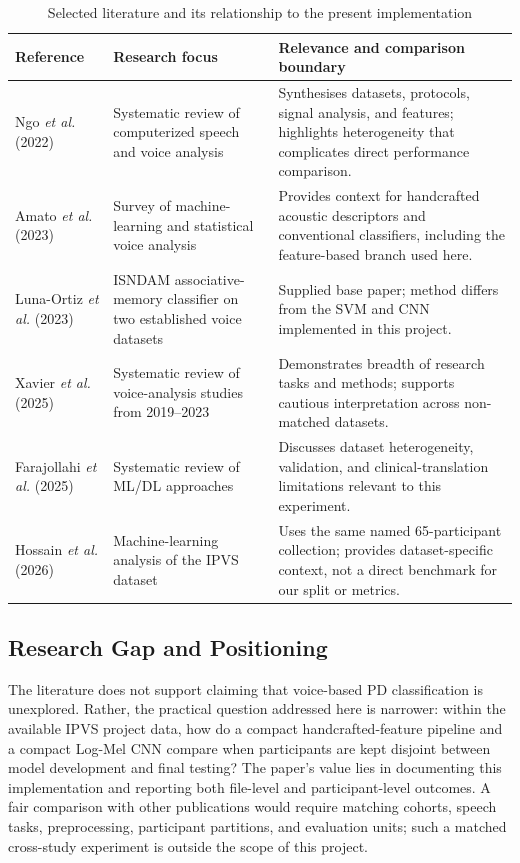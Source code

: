 \documentclass[11pt,a4paper]{article}
\begin{document}
\begin{table}[!t]
\centering
\sloppy
\caption{Selected literature and its relationship to the present implementation}
\label{tab:literature}
\small\begin{tabular}{p{2.5cm}p{3.4cm}p{9.0cm}}
\toprule
Reference & Research focus & Relevance and comparison boundary\\
\midrule
Ngo \emph{et al.} (2022) \cite{ngo2022} & Systematic review of computerized speech and voice analysis & Synthesises datasets, protocols, signal analysis, and features; highlights heterogeneity that complicates direct performance comparison.\\
Amato \emph{et al.} (2023) \cite{amato2023} & Survey of machine-learning and statistical voice analysis & Provides context for handcrafted acoustic descriptors and conventional classifiers, including the feature-based branch used here.\\
Luna-Ortiz \emph{et al.} (2023) \cite{luna2023} & ISNDAM associative-memory classifier on two established voice datasets & Supplied base paper; method differs from the SVM and CNN implemented in this project.\\
Xavier \emph{et al.} (2025) \cite{xavier2025} & Systematic review of voice-analysis studies from 2019--2023 & Demonstrates breadth of research tasks and methods; supports cautious interpretation across non-matched datasets.\\
Farajollahi \emph{et al.} (2025) \cite{farajollahi2025} & Systematic review of ML/DL approaches & Discusses dataset heterogeneity, validation, and clinical-translation limitations relevant to this experiment.\\
Hossain \emph{et al.} (2026) \cite{hossain2026} & Machine-learning analysis of the IPVS dataset & Uses the same named 65-participant collection; provides dataset-specific context, not a direct benchmark for our split or metrics.\\
\bottomrule
\end{tabular}
\end{table}

\subsection{Research Gap and Positioning}
The literature does not support claiming that voice-based PD classification is unexplored. Rather, the practical question addressed here is narrower: within the available IPVS project data, how do a compact handcrafted-feature pipeline and a compact Log-Mel CNN compare when participants are kept disjoint between model development and final testing? The paper's value lies in documenting this implementation and reporting both file-level and participant-level outcomes. A fair comparison with other publications would require matching cohorts, speech tasks, preprocessing, participant partitions, and evaluation units; such a matched cross-study experiment is outside the scope of this project.
\end{document}
